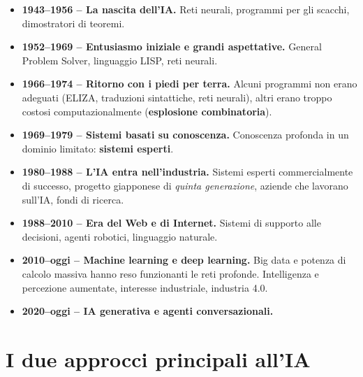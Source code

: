 \begin{itemize}
  \item \textbf{1943--1956 -- La nascita dell'IA.} Reti neurali, programmi per gli
    scacchi, dimostratori di teoremi.
  \item \textbf{1952--1969 -- Entusiasmo iniziale e grandi aspettative.}
    General Problem Solver, linguaggio LISP, reti neurali.
  \item \textbf{1966--1974 -- Ritorno con i piedi per terra.} Alcuni programmi non
    erano adeguati (ELIZA, traduzioni sintattiche, reti neurali), altri erano troppo
    costosi computazionalmente (\textbf{esplosione combinatoria}).
  \item \textbf{1969--1979 -- Sistemi basati su conoscenza.} Conoscenza profonda in
    un dominio limitato: \textbf{sistemi esperti}.
  \item \textbf{1980--1988 -- L'IA entra nell'industria.} Sistemi esperti
    commercialmente di successo, progetto giapponese di \emph{quinta generazione},
    aziende che lavorano sull'IA, fondi di ricerca.
  \item \textbf{1988--2010 -- Era del Web e di Internet.} Sistemi di supporto alle
    decisioni, agenti robotici, linguaggio naturale.
  \item \textbf{2010--oggi -- Machine learning e deep learning.} Big data e potenza
    di calcolo massiva hanno reso funzionanti le reti profonde. Intelligenza e
    percezione aumentate, interesse industriale, industria 4.0.
  \item \textbf{2020--oggi -- IA generativa e agenti conversazionali.}
\end{itemize}

\section{I due approcci principali all'IA}



